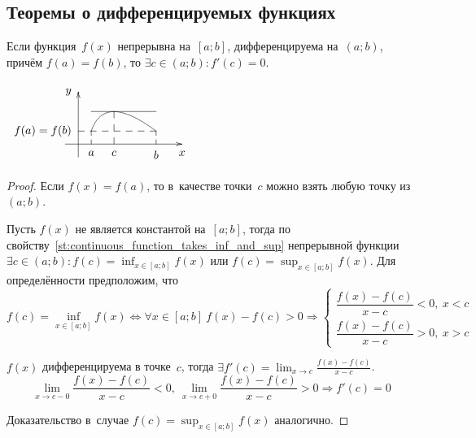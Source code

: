 \subsection{Теоремы о дифференцируемых функциях}
\begin{theorem}[Ролля]
Если функция~$f(x)$ непрерывна на~$[a; b]$, дифференцируема на~$(a; b)$, причём $f(a) = f(b)$, то $\exists c \in (a; b) \colon f'(c) = 0$.
\end{theorem}
\begin{center}
\noindent
$\begin{xy} /r8mm/:
(-0.5, 0); (4, 0) **@{-} *@{>} *++!U{x};
(0, -0.5); (0, 2) **@{-} *@{>} *++!R{y};
(0.5, 0.5) = "a"; (3, 0.5) = "b" **\crv{(1, 2)};
"a"; (0.5, 0) **@{--} *++!U{a};
"b"; (3, 0) **@{--} *++!U{b};
"b"; (0, 0.5) **@{--} *++!R{f(a) = f(b)};
(0.5, 1.2515); (3, 1.2515) **@{-};
(1.377, 1.2515); (1.377, 0) **@{--} *++!U{c};
\end{xy}$
\end{center}
\begin{proof}
Если $f(x) = f(a)$, то в~качестве точки~$c$ можно взять любую точку из~$(a; b)$.

Пусть $f(x)$ не является константой на~$[a; b]$, тогда по свойству~\ref{st:continuous_function_takes_inf_and_sup} непрерывной функции $\displaystyle \exists c \in (a; b) \colon \allowbreak f(c) = \inf_{x \in [a; b]} f(x)$ или $\displaystyle f(c) = \sup_{x \in [a; b]} f(x)$.
Для определённости предположим, что
\begin{equation*}
f(c) = \inf_{x \in [a; b]} f(x) \Leftrightarrow
\forall x \in [a; b] \ f(x) - f(c) > 0 \Rightarrow
\begin{cases}
\dfrac{f(x) - f(c)}{x - c} < 0, \ x < c \\
\dfrac{f(x) - f(c)}{x - c} > 0, \ x > c
\end{cases}
\end{equation*}

$f(x)$ дифференцируема в точке~$c$, тогда $\displaystyle \exists f'(c) = \lim_{x \to c} \frac{f(x) - f(c)}{x - c}$.
\begin{equation*}
\lim_{x \to c-0} \frac{f(x) - f(c)}{x - c} < 0, \
\lim_{x \to c+0} \frac{f(x) - f(c)}{x - c} > 0 \Rightarrow
f'(c) = 0
\end{equation*}

Доказательство в~случае $\displaystyle f(c) = \sup_{x \in [a; b]} f(x)$ аналогично.
\end{proof}

